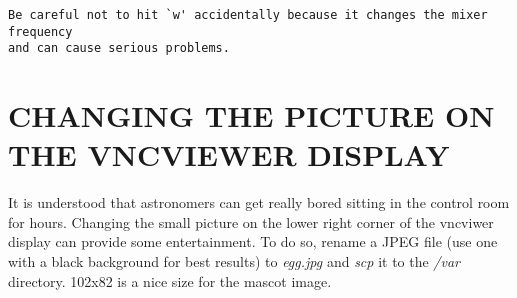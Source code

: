 \documentclass[psfig,preprint]{aastex}
\begin{document}
\begin{verbatim}
Be careful not to hit `w' accidentally because it changes the mixer frequency 
and can cause serious problems.

\end{verbatim}

\section{ CHANGING THE PICTURE ON THE VNCVIEWER DISPLAY } \label{picture}

	It is understood that astronomers can get really bored sitting in the control room for hours.
Changing the small picture on the lower right corner of the vncviwer display can provide some entertainment.
To do so, rename a JPEG file (use one with a black background for best results) to {\it egg.jpg} and
{\it scp} it to the {\it /var} directory.  102x82 is a nice size for the
mascot image.
\end{document}
